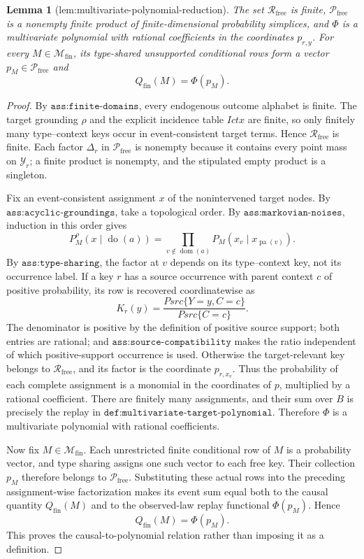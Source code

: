 \documentclass{article}
\newtheorem{lemma}{Lemma}
\begin{document}
\begin{lemma}[lem:multivariate-polynomial-reduction]\label{lem:multivariate-polynomial-reduction}
The set \(\mathcal R_{\mathrm{free}}\) is finite, \(\mathcal P_{\mathrm{free}}\) is a nonempty finite product of finite-dimensional probability simplices, and \(\Phi\) is a multivariate polynomial with rational coefficients in the coordinates \(p_{r,y}\).  For every \(M\in\mathcal M_{\mathrm{fin}}\), its type-shared unsupported conditional rows form a vector \(p_M\in\mathcal P_{\mathrm{free}}\) and
\[
 Q_{\mathrm{fin}}(M)=\Phi(p_M).
\]
\end{lemma}
\begin{proof}
By \(\texttt{ass:finite-domains}\), every endogenous outcome alphabet is finite.  The target grounding \(\rho\) and the explicit incidence table \(Ictx\) are finite, so only finitely many type--context keys occur in event-consistent target terms.  Hence \(\mathcal R_{\mathrm{free}}\) is finite.  Each factor \(\Delta_r\) in \(\mathcal P_{\mathrm{free}}\) is nonempty because it contains every point mass on \(\mathcal Y_r\); a finite product is nonempty, and the stipulated empty product is a singleton.

Fix an event-consistent assignment \(x\) of the nonintervened target nodes.  By \(\texttt{ass:acyclic-groundings}\), take a topological order.  By \(\texttt{ass:markovian-noises}\), induction in this order gives
\[
 P_M^\rho(x\mid\operatorname{do}(a))
 =\prod_{v\notin\operatorname{dom}(a)}
 P_M\!\left(x_v\mid x_{\operatorname{pa}(v)}\right).
\]
By \(\texttt{ass:type-sharing}\), the factor at \(v\) depends on its type--context key, not its occurrence label.  If a key \(r\) has a source occurrence with parent context \(c\) of positive probability, its row is recovered coordinatewise as
\[
 K_r(y)=
 \frac{Psrc\{Y=y,C=c\}}{Psrc\{C=c\}}.
\]
The denominator is positive by the definition of positive source support; both entries are rational; and \(\texttt{ass:source-compatibility}\) makes the ratio independent of which positive-support occurrence is used.  Otherwise the target-relevant key belongs to \(\mathcal R_{\mathrm{free}}\), and its factor is the coordinate \(p_{r,x_v}\).  Thus the probability of each complete assignment is a monomial in the coordinates of \(p\), multiplied by a rational coefficient.  There are finitely many assignments, and their sum over \(B\) is precisely the replay in \(\texttt{def:multivariate-target-polynomial}\).  Therefore \(\Phi\) is a multivariate polynomial with rational coefficients.

Now fix \(M\in\mathcal M_{\mathrm{fin}}\).  Each unrestricted finite conditional row of \(M\) is a probability vector, and type sharing assigns one such vector to each free key.  Their collection \(p_M\) therefore belongs to \(\mathcal P_{\mathrm{free}}\).  Substituting these actual rows into the preceding assignment-wise factorization makes its event sum equal both to the causal quantity \(Q_{\mathrm{fin}}(M)\) and to the observed-law replay functional \(\Phi(p_M)\).  Hence
\[
 Q_{\mathrm{fin}}(M)=\Phi(p_M).
\]
This proves the causal-to-polynomial relation rather than imposing it as a definition.
\end{proof}
\end{document}
